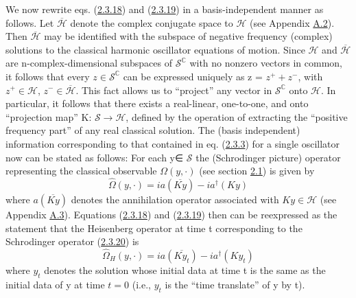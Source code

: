 \documentclass[11pt,a4paper]{article}
\begin{document}
We now rewrite eqs. (\hyperref[eq:2.3.18]{2.3.18}) and (\hyperref[eq:2.3.19]{2.3.19}) in a basis-independent manner as follows. Let \(\overline{\mathcal{H}}\) denote the complex conjugate space to \(\mathcal{H}\) (see Appendix \hyperlink{sec:A.2}{A.2}). Then \(\overline{\mathcal{H}}\) may be identified with the subspace of negative frequency (complex) solutions to the classical harmonic oscillator equations of motion. Since \(\mathcal{H}\) and \(\overline{\mathcal{H}}\) are n-complex-dimensional subspaces of \(\mathcal{S}^{ \mathbb{C}}\) with no nonzero vectors in common, it follows that every \(z \in \mathcal{S}^{\mathbb{C}}\) can be expressed uniquely as z = \(z^+ + z^-\), with \(z^+ \in \mathcal{H}\), \(z^- \in \overline{\mathcal{H}}\). This fact allows us to ``project'' any vector in \(\mathcal{S}^{\mathbb C}\) onto \(\mathcal{H}\). In particular, it follows that there exists a real-linear, one-to-one, and onto ``projection map'' K: \(\mathcal{S} \to \mathcal{H}\), defined by the operation of extracting the ``positive frequency part'' of any real classical solution. The (basis independent) information corresponding to that contained in eq. (\hyperref[eq:2.3.3]{2.3.3}) for a single oscillator now can be stated as follows: For each y∈ \(\mathcal{S}\) the (Schrodinger picture) operator representing the classical observable \(\Omega(y,\cdot)\) (see section \hyperlink{sec:2.1}{2.1}) is given by
\begin{equation*}
\widehat{\Omega}(y,\cdot) = ia(\overline{Ky}) - ia^{\dagger}(Ky) \tag{2.3.20}\label{eq:2.3.20}
\end{equation*}
where \(a(\overline{Ky})\) denotes the annihilation operator associated with \(Ky \in \mathcal{H}\) (see Appendix \hyperlink{sec:A.3}{A.3}). Equations (\hyperref[eq:2.3.18]{2.3.18}) and (\hyperref[eq:2.3.19]{2.3.19}) then can be reexpressed as the statement that the Heisenberg operator at time t corresponding to the Schrodinger operator (\hyperref[eq:2.3.20]{2.3.20}) is
\begin{equation*}
\widehat{\Omega}_{H}(y,\cdot) = ia(\overline{Ky_t}) - ia^{\dagger}(Ky_t) \tag{2.3.21}\label{eq:2.3.21}
\end{equation*}
where \(y_t\) denotes the solution whose initial data at time t is the same as the initial data of y at time \(t=0\) (i.e., \(y_t\) is the ``time translate'' of y by t).

\hypertarget{source-40}{}
\end{document}
